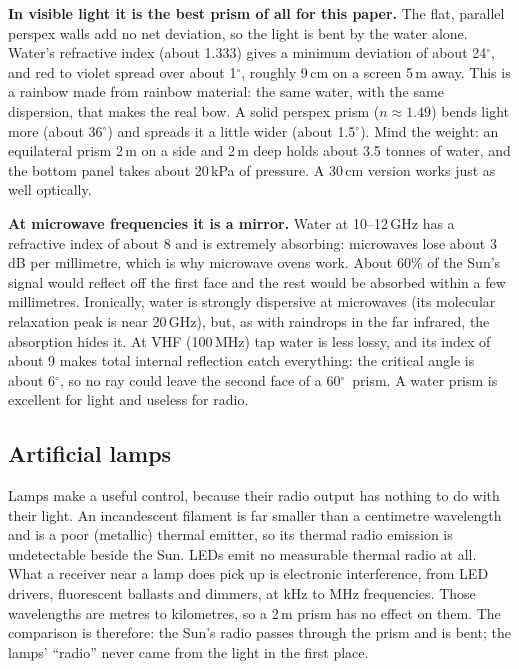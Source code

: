 \documentclass[11pt,a4paper]{article}
\newcommand{\dg}{\ensuremath{^\circ}}
\begin{document}
\textbf{In visible light it is the best prism of all for this paper.} The flat, parallel perspex walls add no net deviation, so the light is bent by the water alone. Water's refractive index (about 1.333) gives a minimum deviation of about 24\dg, and red to violet spread over about 1\dg, roughly 9\,cm on a screen 5\,m away. This is a rainbow made from rainbow material: the same water, with the same dispersion, that makes the real bow. A solid perspex prism ($n\approx1.49$) bends light more (about 36\dg) and spreads it a little wider (about 1.5\dg). Mind the weight: an equilateral prism 2\,m on a side and 2\,m deep holds about 3.5 tonnes of water, and the bottom panel takes about 20\,kPa of pressure. A 30\,cm version works just as well optically.

\textbf{At microwave frequencies it is a mirror.} Water at 10--12\,GHz has a refractive index of about 8 and is extremely absorbing: microwaves lose about 3\,dB per millimetre, which is why microwave ovens work. About 60\% of the Sun's signal would reflect off the first face and the rest would be absorbed within a few millimetres. Ironically, water is strongly dispersive at microwaves (its molecular relaxation peak is near 20\,GHz), but, as with raindrops in the far infrared, the absorption hides it. At VHF (100\,MHz) tap water is less lossy, and its index of about 9 makes total internal reflection catch everything: the critical angle is about 6\dg, so no ray could leave the second face of a 60\dg\ prism. A water prism is excellent for light and useless for radio.

\subsection{Artificial lamps}

Lamps make a useful control, because their radio output has nothing to do with their light. An incandescent filament is far smaller than a centimetre wavelength and is a poor (metallic) thermal emitter, so its thermal radio emission is undetectable beside the Sun. LEDs emit no measurable thermal radio at all. What a receiver near a lamp does pick up is electronic interference, from LED drivers, fluorescent ballasts and dimmers, at kHz to MHz frequencies. Those wavelengths are metres to kilometres, so a 2\,m prism has no effect on them. The comparison is therefore: the Sun's radio passes through the prism and is bent; the lamps' ``radio'' never came from the light in the first place.

\end{document}
